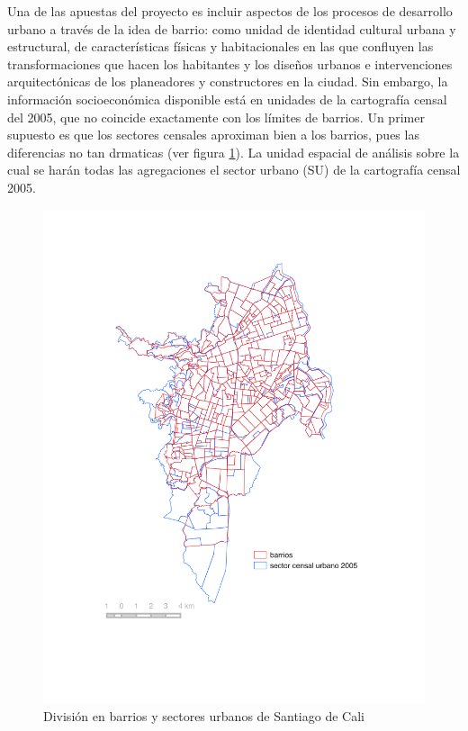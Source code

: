 \documentclass[12pt,]{book}
\begin{document}
Una de las apuestas del proyecto es incluir aspectos de los procesos de
desarrollo urbano a través de la idea de barrio: como unidad de
identidad cultural urbana y estructural, de características físicas y
habitacionales en las que confluyen las transformaciones que hacen los
habitantes y los diseños urbanos e intervenciones arquitectónicas de los
planeadores y constructores en la ciudad. Sin embargo, la información
socioeconómica disponible está en unidades de la cartografía censal del
2005, que no coincide exactamente con los límites de barrios. Un primer
supuesto es que los sectores censales aproximan bien a los barrios, pues
las diferencias no tan drmaticas (ver figura \ref{fig:su-barrios}). La
unidad espacial de análisis sobre la cual se harán todas las
agregaciones el sector urbano (SU) de la cartografía censal 2005.

\begin{figure}
\includegraphics[width=1\linewidth]{images/barrio_sectorurbano} \caption{División en barrios y sectores urbanos de Santiago de Cali}\label{fig:su-barrios}
\end{figure}
\end{document}
